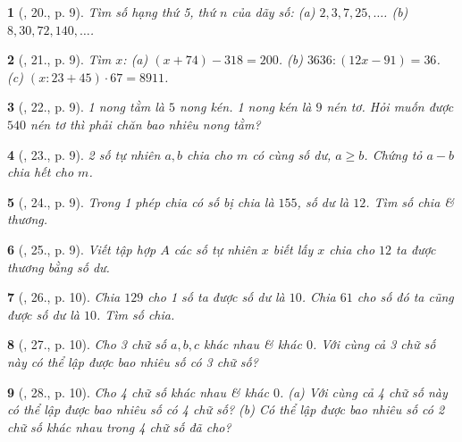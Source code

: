 \documentclass{article}
\newtheorem{baitoan}{}
\begin{document}
\begin{baitoan}[\cite{Tuyen_Toan_6}, 20., p. 9]
	Tìm số hạng thứ 5, thứ $n$ của dãy số: (a) $2,3,7,25,\ldots$. (b) $8,30,72,140,\ldots$.
\end{baitoan}

\begin{baitoan}[\cite{Tuyen_Toan_6}, 21., p. 9]
	Tìm $x$: (a) $(x + 74) - 318 = 200$. (b) $3636:(12x - 91) = 36$. (c) $(x:23 + 45)\cdot67 = 8911$.
\end{baitoan}

\begin{baitoan}[\cite{Tuyen_Toan_6}, 22., p. 9]
	1 nong tằm là $5$ nong kén. 1 nong kén là $9$ nén tơ. Hỏi muốn được $540$ nén tơ thì phải chăn bao nhiêu nong tằm?
\end{baitoan}

\begin{baitoan}[\cite{Tuyen_Toan_6}, 23., p. 9]
	2 số tự nhiên $a,b$ chia cho $m$ có cùng số dư, $a\ge b$. Chứng tỏ $a - b$ chia hết cho $m$.
\end{baitoan}

\begin{baitoan}[\cite{Tuyen_Toan_6}, 24., p. 9]
	Trong 1 phép chia có số bị chia là $155$, số dư là $12$. Tìm số chia \& thương.
\end{baitoan}

\begin{baitoan}[\cite{Tuyen_Toan_6}, 25., p. 9]
	Viết tập hợp $A$ các số tự nhiên $x$ biết lấy $x$ chia cho $12$ ta được thương bằng số dư.
\end{baitoan}

\begin{baitoan}[\cite{Tuyen_Toan_6}, 26., p. 10]
	Chia $129$ cho 1 số ta được số dư là $10$. Chia $61$ cho số đó ta cũng được số dư là $10$. Tìm số chia.
\end{baitoan}

\begin{baitoan}[\cite{Tuyen_Toan_6}, 27., p. 10]
	Cho 3 chữ số $a,b,c$ khác nhau \& khác $0$. Với cùng cả 3 chữ số này có thể lập được bao nhiêu số có 3 chữ số?
\end{baitoan}

\begin{baitoan}[\cite{Tuyen_Toan_6}, 28., p. 10]
	Cho 4 chữ số khác nhau \& khác $0$. (a) Với cùng cả 4 chữ số này có thể lập được bao nhiêu số có 4 chữ số? (b) Có thể lập được bao nhiêu số có 2 chữ số khác nhau trong 4 chữ số đã cho?
\end{baitoan}
\end{document}
